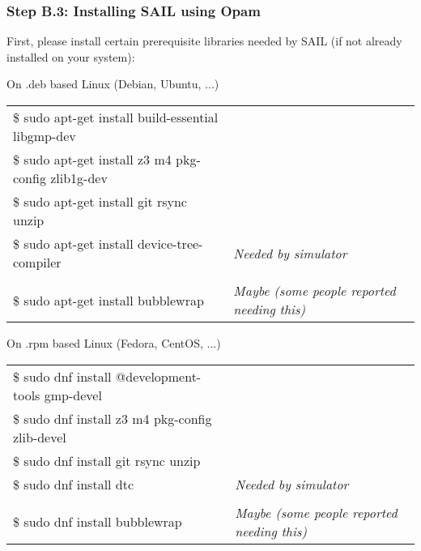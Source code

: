 \documentclass[aspectratio=169]{beamer}
\newcommand{\hm}{\hspace*{1em}}
\newcommand{\tinytt}{\tiny\tt}
\newcommand{\scripttt}{\scriptsize\tt}
\begin{document}
\begin{frame}
  \frametitle{Step B.3: Installing SAIL using Opam}

  First, please install certain prerequisite libraries needed by SAIL (if not already installed on your system):

  \begin{block}{On .deb based Linux (Debian, Ubuntu, ...)}
    \scripttt
    \begin{tabular}{ll}
      \$ sudo apt-get install build-essential libgmp-dev \\
      \$ sudo apt-get install z3 m4 pkg-config zlib1g-dev \\
      \$ sudo apt-get install git  rsync  unzip \\
      \$ sudo apt-get install device-tree-compiler \hm & {\it Needed by simulator} \\
      \\
      \$ sudo apt-get install bubblewrap \hm & {\it Maybe (some people reported needing this)}
    \end{tabular}
  \end{block}

  \begin{block}{On .rpm based Linux (Fedora, CentOS, ...)}
    \tinytt
    \begin{tabular}{ll}
      \$ sudo dnf install @development-tools gmp-devel \\
      \$ sudo dnf install z3 m4 pkg-config zlib-devel \\
      \$ sudo dnf install git rsync unzip \\
      \$ sudo dnf install dtc \hm & {\it Needed by simulator} \\
      \\
      \$ sudo dnf install bubblewrap \hm & {\it Maybe (some people reported needing this)}
    \end{tabular}
  \end{block}

\end{frame}

\end{document}

